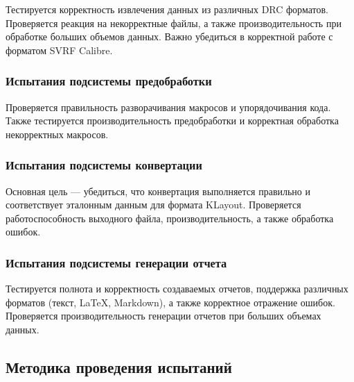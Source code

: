 Тестируется корректность извлечения данных из различных DRC форматов.
Проверяется реакция на некорректные файлы,
а также производительность при обработке больших объемов данных.
Важно убедиться в корректной работе с форматом SVRF Calibre.

\subsubsection{Испытания подсистемы предобработки}

Проверяется правильность разворачивания макросов и упорядочивания кода.
Также тестируется производительность предобработки
и корректная обработка некорректных макросов.

\subsubsection{Испытания подсистемы конвертации}

Основная цель --- убедиться, что конвертация выполняется правильно
и соответствует эталонным данным для формата KLayout.
Проверяется работоспособность выходного файла,
производительность, а также обработка ошибок.

\subsubsection{Испытания подсистемы генерации отчета}

Тестируется полнота и корректность создаваемых отчетов,
поддержка различных форматов (текст, LaTeX, Markdown),
а также корректное отражение ошибок.
Проверяется производительность генерации отчетов при больших объемах данных.

\subsection{Методика проведения испытаний}

